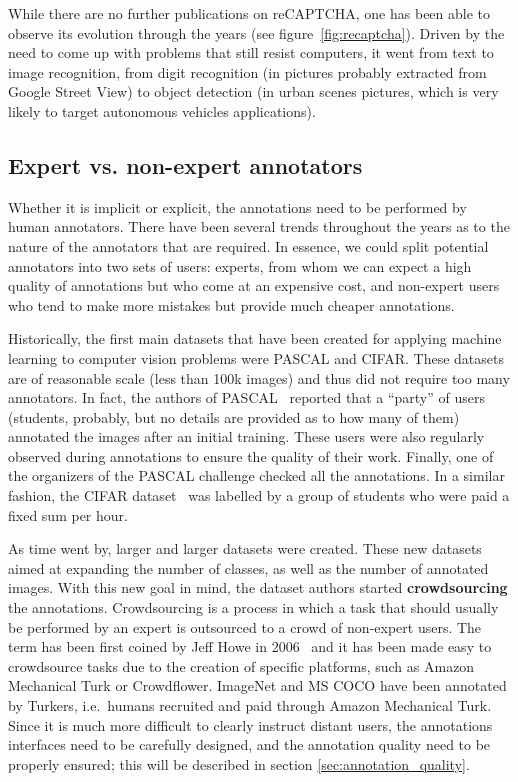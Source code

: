 While there are no further publications on reCAPTCHA,
one has been able to observe its evolution through the years (see figure~\ref{fig:recaptcha}).
Driven by the need to come up with problems that still resist computers,
it went from text to image recognition, from digit recognition
(in pictures probably extracted from Google Street View) to object detection
(in urban scenes pictures, which is very likely to target autonomous vehicles applications).

\subsection{Expert vs. non-expert annotators}

Whether it is implicit or explicit,
the annotations need to be performed by human annotators.
There have been several trends throughout the years
as to the nature of the annotators that are required.
In essence, we could split potential annotators into two sets of users:
experts, from whom we can expect a high quality of annotations
but who come at an expensive cost, and non-expert users
who tend to make more mistakes but provide much cheaper annotations.

Historically, the first main datasets that have been created
for applying machine learning to computer vision problems were PASCAL and CIFAR.
These datasets are of reasonable scale (less than 100k images)
and thus did not require too many annotators.
In fact, the authors of PASCAL~\cite{Everingham10} reported that a ``party'' of users
(students, probably, but no details are provided as to how many of them)
annotated the images after an initial training.
These users were also regularly observed during annotations
to ensure the quality of their work.
Finally, one of the organizers of the PASCAL challenge checked all the annotations.
In a similar fashion, the CIFAR dataset~\cite{krizhevsky2009learning}
was labelled by a group of students who were paid a fixed sum per hour.

As time went by, larger and larger datasets were created.
These new datasets aimed at expanding the number of classes,
as well as the number of annotated images.
With this new goal in mind,
the dataset authors started \textbf{crowdsourcing} the annotations.
Crowdsourcing is a process in which a task that should usually be performed
by an expert is outsourced to a crowd of non-expert users.
The term has been first coined by Jeff Howe in 2006~\cite{howe2006rise}
and it has been made easy to crowdsource tasks
due to the creation of specific platforms,
such as Amazon Mechanical Turk or Crowdflower.
ImageNet and MS COCO have been annotated by Turkers,
i.e.\ humans recruited and paid through Amazon Mechanical Turk.
Since it is much more difficult to clearly instruct distant users,
the annotations interfaces need to be carefully designed,
and the annotation quality need to be properly ensured;
this will be described in section \ref{sec:annotation_quality}.

